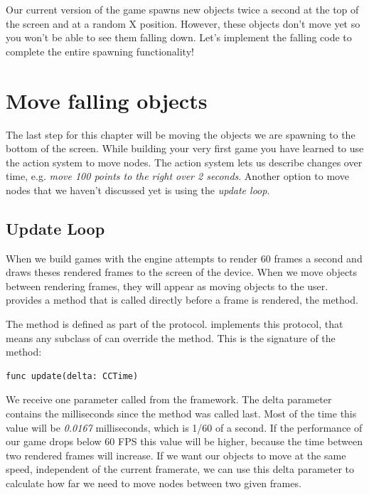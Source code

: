 Our current version of the game spawns new objects twice a second at the top of
the screen and at a random X position. However, these objects don't move yet so
you won't be able to see them falling down. Let's implement the falling code to
complete the entire spawning functionality!

\section{Move falling objects}
The last step for this chapter will be moving the objects we are spawning to the
bottom of the screen. While building your very first \SB{} game you have learned
to use the \cocos{} action system to move nodes. The action system lets us
describe changes over time, e.g. \textit{move 100 points to the right over 2
seconds}. Another option to move nodes that we haven't
discussed yet is using the \cocos{} \textit{update loop}.

\subsection{Update Loop}
When we build games with \cocos{} the engine attempts to render 60 frames a
second and draws theses rendered frames to the screen of the device. When we
move objects between rendering frames, they will appear as moving objects to the
user. \cocos{} provides a method that is called directly before a frame is
rendered, the  method.

The  method is defined as part of the
protocol.  implements this protocol, that means any subclass
of  can override the method. This is the signature of the
 method:
\begin{lstlisting}
func update(delta: CCTime)
\end{lstlisting}
We receive one parameter called  from the \cocos{} framework.
The delta parameter contains the milliseconds since the 
method was called last. Most of the time this value will be \textit{0.0167}
milliseconds, which is 1/60 of a second. If the performance of our game drops
below 60 FPS this value will be higher, because the time between two rendered
frames will increase. If we want our objects to move at the same speed,
independent of the current framerate, we can use this delta parameter to
calculate how far we need to move nodes between two given frames.

